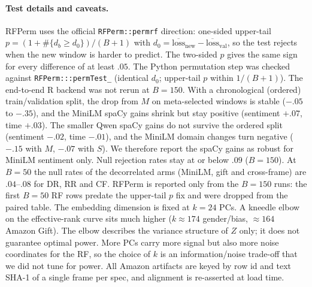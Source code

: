 \paragraph{Test details and caveats.}
RFPerm uses the official \texttt{RFPerm::permrf} direction: one-sided upper-tail
$p=(1+\#\{d_b\ge d_0\})/(B+1)$ with $d_0=\overline{\mathrm{loss}}_{\mathrm{new}}-\overline{\mathrm{loss}}_{\mathrm{val}}$,
so the test rejects when the new window is harder to predict.
The two-sided $p$ gives the same sign for every difference of at least $.05$.
The Python permutation step was checked against \texttt{RFPerm:::permTest\_} (identical $d_0$; upper-tail
$p$ within $1/(B+1)$). The end-to-end R backend was not rerun at $B{=}150$.
With a chronological (ordered) train/validation split, the drop from $M$ on meta-selected windows is
stable ($-.05$ to $-.35$), and the MiniLM spaCy gains shrink but stay positive
(sentiment $+.07$, time $+.03$).
The smaller Qwen spaCy gains do not survive the ordered split (sentiment $-.02$, time $-.01$), and the
MiniLM domain changes turn negative ($-.15$ with $M$, $-.07$ with $S$).
We therefore report the spaCy gains as robust for MiniLM sentiment only.
Null rejection rates stay at or below $.09$ ($B{=}150$).
At $B{=}50$ the null rates of the decorrelated arms (MiniLM, gift and cross-frame) are $.04$--$.08$ for
DR, RR and CF.
RFPerm is reported only from the $B{=}150$ runs: the first $B{=}50$ RF rows predate the upper-tail $p$ fix
and were dropped from the paired table.
The embedding dimension is fixed at $k{=}24$ PCs. A kneedle elbow on the effective-rank curve sits much
higher ($k\approx174$ gender/bias, $\approx164$ Amazon Gift).
The elbow describes the variance structure of $Z$ only; it does not guarantee optimal power.
More PCs carry more signal but also more noise coordinates for the RF, so the choice of $k$ is an
information/noise trade-off that we did not tune for power.
All Amazon artifacts are keyed by row id and text SHA-1 of a single frame per spec, and alignment
is re-asserted at load time.
